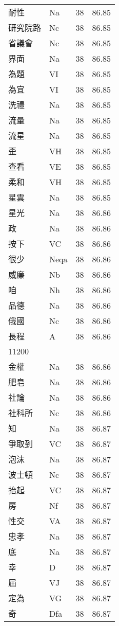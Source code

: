 \documentclass[twocolumn]{book}
\begin{document}
\begin{supertabular}{llrr}
耐性 & Na & 38 &  86.85\\
研究院路 & Nc & 38 &  86.85\\
省議會 & Nc & 38 &  86.85\\
界面 & Na & 38 &  86.85\\
為題 & VI & 38 &  86.85\\
為宜 & VI & 38 &  86.85\\
洗禮 & Na & 38 &  86.85\\
流量 & Na & 38 &  86.85\\
流星 & Na & 38 &  86.85\\
歪 & VH & 38 &  86.85\\
查看 & VE & 38 &  86.85\\
柔和 & VH & 38 &  86.85\\
星雲 & Na & 38 &  86.85\\
星光 & Na & 38 &  86.86\\
政 & Na & 38 &  86.86\\
按下 & VC & 38 &  86.86\\
很少 & Neqa & 38 &  86.86\\
威廉 & Nb & 38 &  86.86\\
咱 & Nh & 38 &  86.86\\
品德 & Na & 38 &  86.86\\
俄國 & Nc & 38 &  86.86\\
長程 & A & 38 &  86.86\\
11200\\
金權 & Na & 38 &  86.86\\
肥皂 & Na & 38 &  86.86\\
社論 & Na & 38 &  86.86\\
社科所 & Nc & 38 &  86.86\\
知 & Na & 38 &  86.87\\
爭取到 & VC & 38 &  86.87\\
泡沫 & Na & 38 &  86.87\\
波士頓 & Nc & 38 &  86.87\\
抬起 & VC & 38 &  86.87\\
房 & Nf & 38 &  86.87\\
性交 & VA & 38 &  86.87\\
忠孝 & Na & 38 &  86.87\\
底 & Na & 38 &  86.87\\
幸 & D & 38 &  86.87\\
屆 & VJ & 38 &  86.87\\
定為 & VG & 38 &  86.87\\
奇 & Dfa & 38 &  86.87\\

\end{supertabular}
\end{document}
